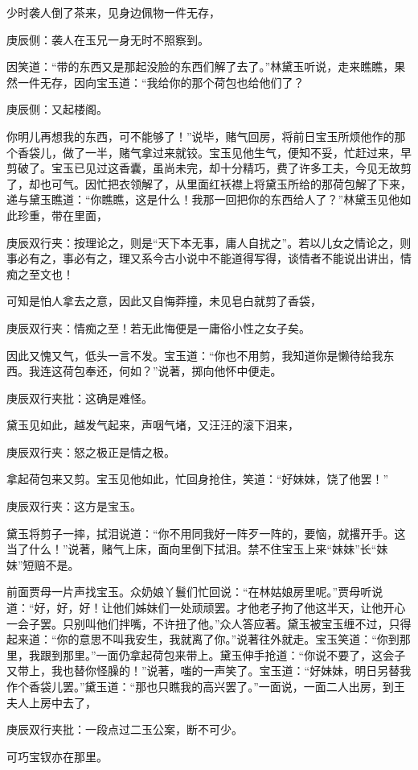 \begin{parag}
    少时袭人倒了茶来，见身边佩物一件无存，\begin{note}庚辰侧：袭人在玉兄一身无时不照察到。\end{note}因笑道：“带的东西又是那起没脸的东西们解了去了。”林黛玉听说，走来瞧瞧，果然一件无存，因向宝玉道：“我给你的那个荷包也给他们了？\begin{note}庚辰侧：又起楼阁。\end{note}你明儿再想我的东西，可不能够了！”说毕，赌气回房，将前日宝玉所烦他作的那个香袋儿，做了一半，赌气拿过来就铰。宝玉见他生气，便知不妥，忙赶过来，早剪破了。宝玉已见过这香囊，虽尚未完，却十分精巧，费了许多工夫，今见无故剪了，却也可气。因忙把衣领解了，从里面红袄襟上将黛玉所给的那荷包解了下来，递与黛玉瞧道：“你瞧瞧，这是什么！我那一回把你的东西给人了？”林黛玉见他如此珍重，带在里面，\begin{note}庚辰双行夹：按理论之，则是“天下本无事，庸人自扰之”。若以儿女之情论之，则事必有之，事必有之，理又系今古小说中不能道得写得，谈情者不能说出讲出，情痴之至文也！\end{note}可知是怕人拿去之意，因此又自悔莽撞，未见皂白就剪了香袋，\begin{note}庚辰双行夹：情痴之至！若无此悔便是一庸俗小性之女子矣。\end{note}因此又愧又气，低头一言不发。宝玉道：“你也不用剪，我知道你是懒待给我东西。我连这荷包奉还，何如？”说著，掷向他怀中便走。\begin{note}庚辰双行夹批：这确是难怪。\end{note}黛玉见如此，越发气起来，声咽气堵，又汪汪的滚下泪来，\begin{note}庚辰双行夹：怒之极正是情之极。\end{note}拿起荷包来又剪。宝玉见他如此，忙回身抢住，笑道：“好妹妹，饶了他罢！”\begin{note}庚辰双行夹：这方是宝玉。\end{note}黛玉将剪子一摔，拭泪说道：“你不用同我好一阵歹一阵的，要恼，就撂开手。这当了什么！”说著，赌气上床，面向里倒下拭泪。禁不住宝玉上来“妹妹”长“妹妹”短赔不是。
\end{parag}


\begin{parag}
    前面贾母一片声找宝玉。众奶娘丫鬟们忙回说：“在林姑娘房里呢。”贾母听说道：“好，好，好！让他们姊妹们一处顽顽罢。才他老子拘了他这半天，让他开心一会子罢。只别叫他们拌嘴，不许扭了他。”众人答应著。黛玉被宝玉缠不过，只得起来道：“你的意思不叫我安生，我就离了你。”说著往外就走。宝玉笑道：“你到那里，我跟到那里。”一面仍拿起荷包来带上。黛玉伸手抢道：“你说不要了，这会子又带上，我也替你怪臊的！”说著，嗤的一声笑了。宝玉道：“好妹妹，明日另替我作个香袋儿罢。”黛玉道：“那也只瞧我的高兴罢了。”一面说，一面二人出房，到王夫人上房中去了，\begin{note}庚辰双行夹批：一段点过二玉公案，断不可少。\end{note}可巧宝钗亦在那里。
\end{parag}


